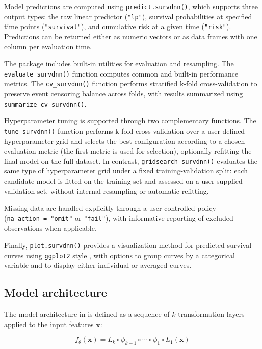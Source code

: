 Model predictions are computed using \texttt{predict.survdnn()}, which supports three output types: the raw linear predictor (\texttt{"lp"}), survival probabilities at specified time points (\texttt{"survival"}), and cumulative risk at a given time (\texttt{"risk"}). Predictions can be returned either as numeric vectors or as data frames with one column per evaluation time.

The package includes built-in utilities for evaluation and resampling. The \texttt{evaluate\_survdnn()} function computes common and built-in performance metrics. The \texttt{cv\_survdnn()} function performs stratified k-fold cross-validation to preserve event censoring balance across folds, with results summarized using \texttt{summarize\_cv\_survdnn()}.

Hyperparameter tuning is supported through two complementary functions. The \texttt{tune\_survdnn()} function performs k-fold cross-validation over a user-defined hyperparameter grid and selects the best configuration according to a chosen evaluation metric (the first metric is used for selection), optionally refitting the final model on the full dataset. In contrast, \texttt{gridsearch\_survdnn()} evaluates the same type of hyperparameter grid under a fixed training-validation split: each candidate model is fitted on the training set and assessed on a user-supplied validation set, without internal resampling or automatic refitting.

Missing data are handled explicitly through a user-controlled policy (\texttt{na\_action\ =\ "omit"} or \texttt{"fail"}), with informative reporting of excluded observations when applicable.

Finally, \texttt{plot.survdnn()} provides a visualization method for predicted survival curves using \texttt{ggplot2} style \citep{wickham2026ggplot2}, with options to group curves by a categorical variable and to display either individual or averaged curves.

\subsection{Model architecture}\label{model-architecture}

The model architecture in  is defined as a sequence of \(k\) transformation layers applied to the input features \(\mathbf{x}\):

\[
f_\theta(\mathbf{x}) = L_k \circ \phi_{k-1} \circ \cdots \circ \phi_1 \circ L_1(\mathbf{x})
\]

